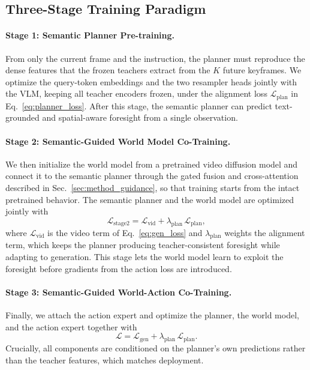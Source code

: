 \subsection{Three-Stage Training Paradigm}
\label{sec:method_training}

\paragraph{Stage 1: Semantic Planner Pre-training.}
From only the current frame and the instruction, the planner must reproduce the
dense features that the frozen teachers extract from the $K$ future keyframes.
We optimize the query-token embeddings and the two resampler heads jointly with
the VLM, keeping all teacher encoders frozen,
under the alignment loss $\mathcal{L}_{\mathrm{plan}}$ in
Eq.~\eqref{eq:planner_loss}.
After this stage, the semantic planner can predict text-grounded and
spatial-aware foresight from a single observation.

\paragraph{Stage 2: Semantic-Guided World Model Co-Training.}
We then initialize the world model from a pretrained video diffusion model and
connect it to the semantic planner through the gated fusion and cross-attention
described in Sec.~\ref{sec:method_guidance}, so that training starts from the
intact pretrained behavior.
The semantic planner and the world model are optimized jointly with
\begin{equation}
    \mathcal{L}_{\mathrm{stage2}}
    =
    \mathcal{L}_{\mathrm{vid}}
    +
    \lambda_{\mathrm{plan}}\,\mathcal{L}_{\mathrm{plan}},
    \label{eq:stage2_loss}
\end{equation}
where $\mathcal{L}_{\mathrm{vid}}$ is the video term of Eq.~\eqref{eq:gen_loss} and
$\lambda_{\mathrm{plan}}$ weights the alignment term, which keeps the planner
producing teacher-consistent foresight while adapting to generation.
This stage lets the world model learn to exploit the foresight before gradients from the action loss are introduced.

\paragraph{Stage 3: Semantic-Guided World-Action Co-Training.}
Finally, we attach the action expert and optimize the planner, the world model,
and the action expert together with
\begin{equation}
    \mathcal{L}
    =
    \mathcal{L}_{\mathrm{gen}}
    +
    \lambda_{\mathrm{plan}}\,\mathcal{L}_{\mathrm{plan}}.
    \label{eq:total_loss}
\end{equation}
Crucially, all components are conditioned on the planner's own predictions
rather than the teacher features, which matches deployment.


